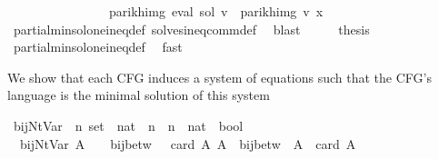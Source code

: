 \begin{isabellebody}
\ \ \ \ \ \ \ \ \ \ \ \ \ \ \ {\isasymlongrightarrow}\ parikh{\isacharunderscore}{\kern0pt}img\ {\isacharparenleft}{\kern0pt}eval\ sol\ v{\isacharprime}{\kern0pt}{\isacharparenright}{\kern0pt}\ {\isasymsubseteq}\ parikh{\isacharunderscore}{\kern0pt}img\ {\isacharparenleft}{\kern0pt}v{\isacharprime}{\kern0pt}\ x{\isacharparenright}{\kern0pt}{\isachardoublequoteclose}\isanewline
\ \ \ \ \isamarkupfalse%
\ partial{\isacharunderscore}{\kern0pt}min{\isacharunderscore}{\kern0pt}sol{\isacharunderscore}{\kern0pt}one{\isacharunderscore}{\kern0pt}ineq{\isacharunderscore}{\kern0pt}def\ solves{\isacharunderscore}{\kern0pt}ineq{\isacharunderscore}{\kern0pt}comm{\isacharunderscore}{\kern0pt}def\ \isamarkupfalse%
\ blast\isanewline
\ \ \isamarkupfalse%
\ \isamarkupfalse%
\ {\isacharquery}{\kern0pt}thesis\ \isamarkupfalse%
\ partial{\isacharunderscore}{\kern0pt}min{\isacharunderscore}{\kern0pt}sol{\isacharunderscore}{\kern0pt}one{\isacharunderscore}{\kern0pt}ineq{\isacharunderscore}{\kern0pt}def\ \isamarkupfalse%
\ fast\isanewline
{}\isamarkupfalse%
%
\endisatagproof
{\isafoldproof}%
%
\isadelimproof
%
\endisadelimproof
%
\isadelimdocument
%
\endisadelimdocument
%
\isatagdocument
%
\isamarkuptrue%
%
\endisatagdocument
{\isafolddocument}%
%
\isadelimdocument
%
\endisadelimdocument
%
\begin{isamarkuptext}%
We show that each CFG induces a system of equations such that the CFG's language is the
minimal solution of this system%
\end{isamarkuptext}\isamarkuptrue%
\isamarkupfalse%
\ bij{\isacharunderscore}{\kern0pt}Nt{\isacharunderscore}{\kern0pt}Var\ {\isacharcolon}{\kern0pt}{\isacharcolon}{\kern0pt}\ {\isachardoublequoteopen}{\isacharprime}{\kern0pt}n\ set\ {\isasymRightarrow}\ {\isacharparenleft}{\kern0pt}nat\ {\isasymRightarrow}\ {\isacharprime}{\kern0pt}n{\isacharparenright}{\kern0pt}\ {\isasymRightarrow}\ {\isacharparenleft}{\kern0pt}{\isacharprime}{\kern0pt}n\ {\isasymRightarrow}\ nat{\isacharparenright}{\kern0pt}\ {\isasymRightarrow}\ bool{\isachardoublequoteclose}\ \isanewline
\ \ {\isachardoublequoteopen}bij{\isacharunderscore}{\kern0pt}Nt{\isacharunderscore}{\kern0pt}Var\ A\ {\isasymgamma}\ {\isasymgamma}{\isacharprime}{\kern0pt}\ {\isasymequiv}\ bij{\isacharunderscore}{\kern0pt}betw\ {\isasymgamma}\ {\isacharbraceleft}{\kern0pt}{\isachardot}{\kern0pt}{\isachardot}{\kern0pt}{\isacharless}{\kern0pt}\ card\ A{\isacharbraceright}{\kern0pt}\ A\ {\isasymand}\ bij{\isacharunderscore}{\kern0pt}betw\ {\isasymgamma}{\isacharprime}{\kern0pt}\ A\ {\isacharbraceleft}{\kern0pt}{\isachardot}{\kern0pt}{\isachardot}{\kern0pt}{\isacharless}{\kern0pt}\ card\ A{\isacharbraceright}{\kern0pt}\isanewline

\end{isabellebody}
